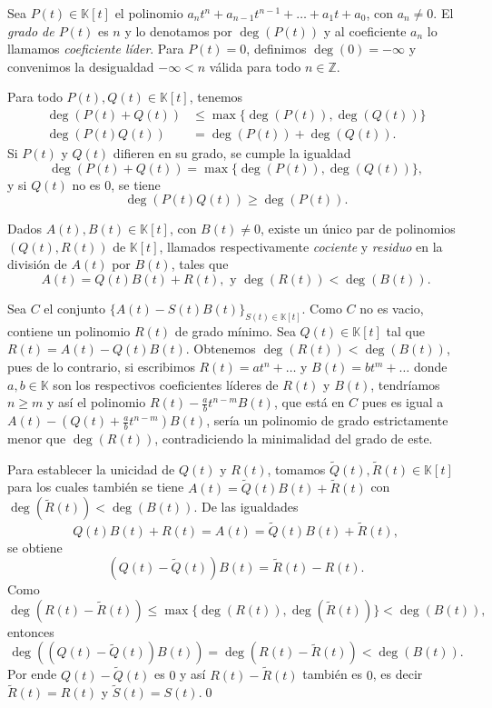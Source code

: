 \begin{defn}
Sea $P(t)\in \mathbb{K}[t]$ el polinomio $a_nt^n+a_{n-1}t^{n-1}+\ldots+a_1t+a_0$, con $a_n\ne 0$. El \emph{grado de $P(t)$} es $n$ y lo denotamos por $\deg\left(P(t)\right)$ y al coeficiente $a_n$ lo llamamos \emph{coeficiente líder}. Para $P(t)=0$, definimos $\deg\left(0\right)=-\infty$ y convenimos la desigualdad $-\infty<n$ v\'alida para todo $n\in\mathbb{Z}$.
\end{defn}

\begin{obs}
Para todo $P(t),Q(t)\in \mathbb{K}[t]$, tenemos
\begin{align*}
\deg\left(P(t)+Q(t)\right) &  \le \max\{\deg\left(P(t)\right),\deg\left(Q(t)\right)\}\\
\deg\left(P(t)Q(t)\right) & = \deg(P(t))+\deg(Q(t)).
\end{align*}
Si $P(t)$ y $Q(t)$ difieren en su grado, se cumple la igualdad
\[
\deg\left(P(t)+Q(t)\right)=\max\{\deg\left(P(t)\right),\deg\left(Q(t)\right)\},
\]
y si $Q(t)$ no es $0$, se tiene
\[
\deg\left(P(t)Q(t)\right) \ge \deg\left(P(t)\right).
\]
\end{obs}

\begin{teo}
Dados $A(t),B(t)\in \mathbb{K}[t]$, con $B(t)\ne 0$, existe un único par de polinomios $(Q(t),R(t))$ de $\mathbb{K}[t]$, llamados respectivamente \emph{cociente} y \emph{residuo} en la división de $A(t)$ por $B(t)$, tales que
\[
A(t)=Q(t)B(t)+R(t),\textrm{ y } \deg\left(R(t)\right)<\deg\left(B(t)\right).
\]
\end{teo}

\dem Sea $C$ el conjunto $\{A(t)-S(t)B(t)\}_{S(t)\in \mathbb{K}[t]}$. Como $C$ no es vacio, contiene un polinomio $R(t)$ de grado mínimo. Sea $Q(t)\in \mathbb{K}[t]$ tal que $R(t)=A(t)-Q(t)B(t)$. Obtenemos $\deg\left(R(t)\right)<\deg\left(B(t)\right)$, pues de lo contrario, si escribimos
$R(t)=at^{n}+\ldots$ y $B(t)=bt^{m}+\ldots$ donde $a,b\in \mathbb{K}$ son los respectivos coeficientes líderes de $R(t)$ y $B(t)$, tendríamos $n\ge m$ y así el polinomio $R(t)-\frac{a}{b}t^{n-m}B(t)$, que está en $C$ pues es igual a $A(t)-\left(Q(t)+\frac{a}{b}t^{n-m}\right)B(t)$, sería un polinomio de grado estrictamente menor que $\deg\left(R(t)\right)$, contradiciendo la minimalidad del grado de este.

Para establecer la unicidad de $Q(t)$ y $R(t)$, tomamos $\tilde{Q}(t),\tilde{R}(t)\in \mathbb{K}[t]$ para los cuales tambi\'en se tiene $A(t)=\tilde{Q}(t)B(t)+\tilde{R}(t)$ con $\deg\left(\tilde{R}(t)\right)<\deg\left(B(t)\right)$. De las igualdades
$$Q(t)B(t)+R(t)=A(t)=\tilde{Q}(t)B(t)+\tilde{R}(t),$$
se obtiene
$$\left(Q(t)-\tilde{Q}(t)\right)B(t)=\tilde{R}(t)-R(t).$$
Como
$$\deg\left(R(t)-\tilde{R}(t)\right)\le \max\{\deg\left(R(t)\right),\deg\left(\tilde{R}(t)\right)\}<\deg\left(B(t)\right),$$ entonces
$$\deg\left((Q(t)-\tilde{Q}(t))B(t)\right)=\deg\left(R(t)-\tilde{R}(t)\right)<\deg\left(B(t)\right).$$
Por ende $Q(t)-\tilde{Q}(t)$ es $0$ y así $R(t)-\tilde{R}(t)$ también es $0$, es decir $\tilde{R}(t)=R(t)$ y $\tilde{S}(t)=S(t)$.\qed

